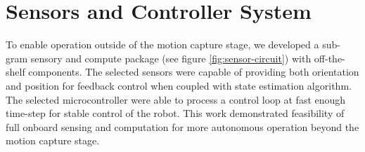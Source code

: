 \documentclass[../main.tex]{subfiles}
\begin{document}
\section{Sensors and Controller System}
\label{sec:sense_and_control}

To enable operation outside of the motion capture stage, we developed a sub-gram sensory and compute package (see figure \ref{fig:sensor-circuit}) with off-the-shelf components. The selected sensors were capable of providing both orientation and position for feedback control when coupled with state estimation algorithm. The selected microcontroller were able to process a control loop at fast enough time-step for stable control of the robot. This work demonstrated feasibility of full onboard sensing and computation for more autonomous operation beyond the motion capture stage.


\end{document}
